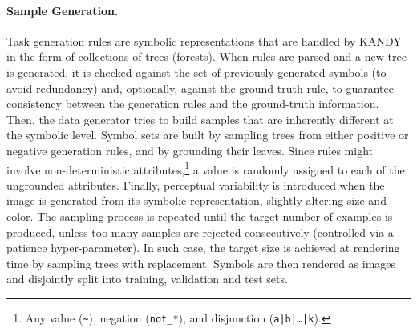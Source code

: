 \paragraph{Sample Generation.} 
Task generation rules are symbolic representations that are handled by \textsc{KANDY} in the form of collections of trees (forests). When rules are parsed and a new tree is generated, it is checked against the set of previously generated symbols (to avoid redundancy) and, optionally, against the ground-truth rule, to guarantee consistency between the generation rules and the ground-truth information. 
%
Then, the data generator tries to build samples that are inherently different at the symbolic level.
Symbol sets are built by sampling trees from either positive or negative generation rules, and by grounding their leaves.
Since rules might involve non-deterministic attributes,\footnote{Any value (\texttt{\textasciitilde}), negation (\texttt{not\_*}), and disjunction (\texttt{a|b|\dots|k}).} a value is randomly assigned to each of the ungrounded attributes. %
Finally, perceptual variability is introduced when the image is generated from its symbolic representation, slightly altering size and color. 
%
%
The sampling process is repeated until the target number of examples is produced, unless too many samples are rejected consecutively (controlled via a patience hyper-parameter). In such case, the target size is achieved at rendering time by sampling trees with replacement.
%
%
Symbols are then rendered as images and disjointly split into training, validation and test sets.
